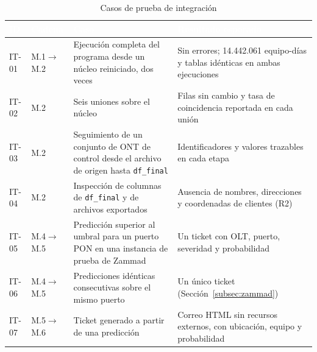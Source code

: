 \documentclass[12pt,a4paper]{article}
\begin{document}
\begin{table}[H]
\centering
\caption{Casos de prueba de integración}
\label{tab:integracion}
\small
\renewcommand{\arraystretch}{1.3}
\begin{tabularx}{\textwidth}{|p{1.15cm}|p{1.9cm}|X|X|}
\hline
\rowcolor{black}
\textcolor{white}{\textbf{ID}} & \textcolor{white}{\textbf{Cadena}} & \textcolor{white}{\textbf{Caso}} & \textcolor{white}{\textbf{Resultado esperado}} \\ \hline
IT-01 & M.1$\rightarrow$M.2 & Ejecución completa del programa desde un núcleo reiniciado, dos veces & Sin errores; 14.442.061 equipo-días y tablas idénticas en ambas ejecuciones \\ \hline
IT-02 & M.2 & Seis uniones sobre el núcleo & Filas sin cambio y tasa de coincidencia reportada en cada unión \\ \hline
IT-03 & M.2 & Seguimiento de un conjunto de ONT de control desde el archivo de origen hasta \texttt{df\_final} & Identificadores y valores trazables en cada etapa \\ \hline
IT-04 & M.2 & Inspección de columnas de \texttt{df\_final} y de archivos exportados & Ausencia de nombres, direcciones y coordenadas de clientes (R2) \\ \hline
IT-05 & M.4$\rightarrow$M.5 & Predicción superior al umbral para un puerto PON en una instancia de prueba de Zammad & Un ticket con OLT, puerto, severidad y probabilidad \\ \hline
IT-06 & M.4$\rightarrow$M.5 & Predicciones idénticas consecutivas sobre el mismo puerto & Un único ticket (Sección~\ref{subsec:zammad}) \\ \hline
IT-07 & M.5$\rightarrow$M.6 & Ticket generado a partir de una predicción & Correo HTML sin recursos externos, con ubicación, equipo y probabilidad \\ \hline
\end{tabularx}
\end{table}
\end{document}
